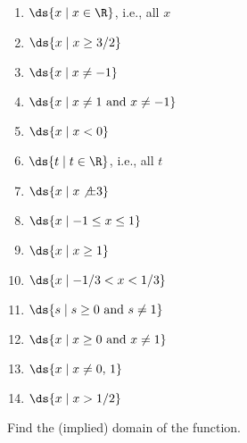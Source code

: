\begin{enumialphparenastyle}
\begin{multicols}{2}
\begin{ex}
\begin{sol}
\begin{enumerate}
	\item	$\ds \{x\mid x\in \R\}$, i.e., all $x$
	\item	$\ds \{x\mid x\ge 3/2\}$
	\item	$\ds \{x\mid x\not=-1\}$
	\item	$\ds \{x\mid x\not=1 \hbox{ and } x\not=-1\}$
	\item	$\ds \{x\mid x<0\}$
	\item	$\ds \{t\mid t\in \R\}$, i.e., all $t$
	\item	$\ds \{x\mid x\not \pm 3\}$
	\item	$\ds \{x\mid -1\le x\le 1\}$
	\item	$\ds \{x\mid x\ge 1\}$
	\item	$\ds \{x\mid -1/3< x< 1/3\}$
	\item	$\ds \{s\mid s\ge0  \hbox{ and } s\not=1\}$
	\item	$\ds \{x\mid x\ge0  \hbox{ and } x\not=1\}$
	\item  $\ds \{x\mid x\not=0,\, 1\}$
	\item  $\ds \{x\mid x> 1/2\}$
\end{enumerate}
\end{sol}
\end{ex}

\begin{ex}
Find the (implied) domain of the function.



\end{ex}
\end{multicols}
\end{enumialphparenastyle}

